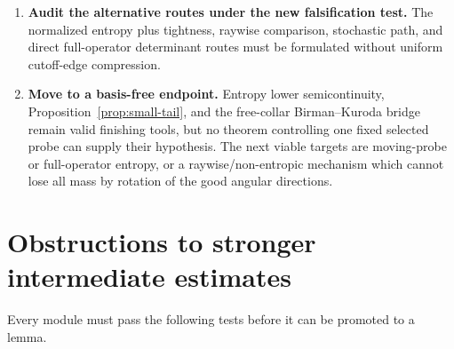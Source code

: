 \documentclass[11pt]{article}
\theoremstyle{definition}
\theoremstyle{remark}
\begin{document}
\begin{enumerate}[label=\textbf{Stage \arabic*.},leftmargin=*]
 \item \textbf{Audit the alternative routes under the new falsification test.}  The normalized entropy plus tightness, raywise comparison, stochastic path, and direct full-operator determinant routes must be formulated without uniform cutoff-edge compression.
 \item \textbf{Move to a basis-free endpoint.}  Entropy lower semicontinuity, Proposition~\ref{prop:small-tail}, and the free-collar Birman--Kuroda bridge remain valid finishing tools, but no theorem controlling one fixed selected probe can supply their hypothesis.  The next viable targets are moving-probe or full-operator entropy, or a raywise/non-entropic mechanism which cannot lose all mass by rotation of the good angular directions.
\end{enumerate}

\section{Obstructions to stronger intermediate estimates}

Every module must pass the following tests before it can be promoted to a lemma.
\end{document}
